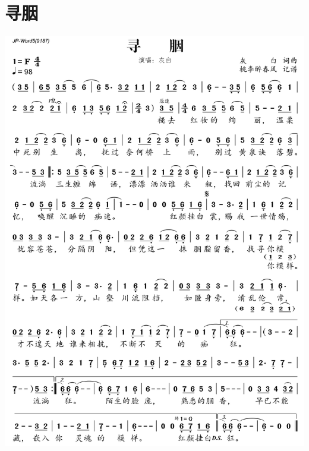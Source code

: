 \documentclass[cn,pad,twocol]{elegantbook}
\begin{document}
\section{寻胭}\includegraphics[width=\textwidth]{rpi400/20210124-寻胭.png}
\end{document}
